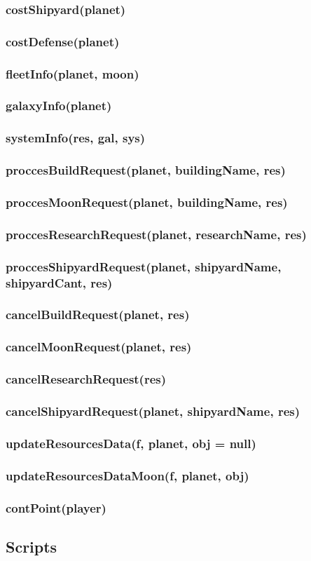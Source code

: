 \documentclass{article}
\begin{document}
        \subsubsection{costShipyard(planet)}
        \subsubsection{costDefense(planet)}
        \subsubsection{fleetInfo(planet, moon)}
        \subsubsection{galaxyInfo(planet)}
        \subsubsection{systemInfo(res, gal, sys)}
        \subsubsection{proccesBuildRequest(planet, buildingName, res)}
        \subsubsection{proccesMoonRequest(planet, buildingName, res)}
        \subsubsection{proccesResearchRequest(planet, researchName, res)}
        \subsubsection{proccesShipyardRequest(planet, shipyardName, shipyardCant, res)}
        \subsubsection{cancelBuildRequest(planet, res)}
        \subsubsection{cancelMoonRequest(planet, res)}
        \subsubsection{cancelResearchRequest(res)}
        \subsubsection{cancelShipyardRequest(planet, shipyardName, res)}
        \subsubsection{updateResourcesData(f, planet, obj = null)}
        \subsubsection{updateResourcesDataMoon(f, planet, obj)}
        \subsubsection{contPoint(player)}
    \subsection{Scripts}
\end{document}

